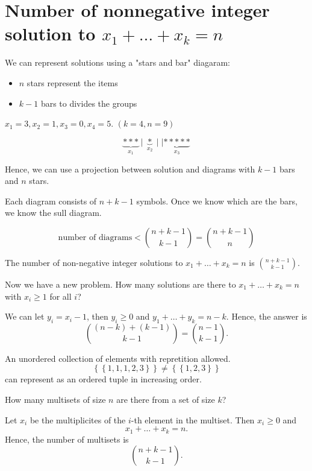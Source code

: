 \section{Number of nonnegative integer solution to \(x_1 + \dots + x_k = n\)}
We can represent solutions using a "stars and bar" diagaram:
\begin{itemize}
    \item \(n\) stars represent the items 
    \item \(k-1\) bars to divides the groups  
\end{itemize}
\begin{eg}
    \(x_1 = 3, x_2 = 1, x_3 = 0, x_4 = 5\). \((k=4, n=9)\)  
\end{eg}
\begin{explanation}
    \[
        \underbrace{* * *}_{x_1} \mid \underbrace{*}_{x_2} \mid \mid \underbrace{* * * * *}_{x_3}
    \]
\end{explanation}

Hence, we can use a projection between solution and diagrams with \(k-1\) bars and \(n\) stars. 

Each diagram consists of \(n + k - 1\) symbols. Once we know which are the bars, we know the sull diagram. 

\[
    \text{number of diagrams} < \binom{n + k - 1}{k - 1} = \binom{n + k - 1}{n}
\]

\begin{proposition}
    The number of non-negative integer solutions to \(x_1 + \dots + x_k = n\) is \(\binom{n + k - 1}{k - 1}\). 
\end{proposition}
Now we have a new problem. How many solutions are there to \(x_1 + \dots + x_k = n\) with \(x_i \ge 1\) for all \(i\)?

We can let \(y_i = x_i - 1\), then \(y_i \ge 0\) and \(y_1 + \dots + y_k = n - k\). Hence, the answer is 
\[
    \binom{(n - k) + (k - 1)}{k-1} = \binom{n-1}{k-1}.
\]   

\begin{definition}[Multisets] \label{def: multiset}
    An unordered collection of elements with repretition allowed. 
    \[
        \left\{ \left\{ 1,1,1,2,3 \right\}  \right\} \neq \left\{ \left\{ 1,2,3 \right\}  \right\} 
    \] can represent as an ordered tuple in increasing order.
\end{definition}

\begin{eg}
    How many multisets of size \(n\) are there from a set of size \(k\)?  
\end{eg}
\begin{explanation}
    Let \(x_i\) be the multiplicites of the \(i\)-th element in the multiset. Then \(x_i \ge 0\) and 
    \[
        x_1 + \dots + x_k = n.
    \]   
    Hence, the number of multisets is 
    \[
        \binom{n + k - 1}{k - 1}.
    \]
\end{explanation}

